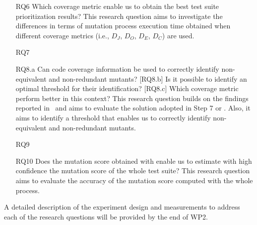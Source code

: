 \begin{itemize}
    \item[RQ6] Which coverage metric enable us to obtain the best test suite prioritization results? This research question aims to investigate the differences in terms of mutation process execution time obtained when different coverage metrics (i.e., $D_J$, $D_O$, $D_E$, $D_C$) are used.
    

    \item[RQ7] 

    \item[RQ8.a] Can code coverage information be used to correctly identify non-equivalent and non-redundant mutants? [RQ8.b] Is it possible to identify an optimal threshold for their identification? [RQ8.c] Which coverage metric perform better in this context? This research question builds on the findings reported in~\cite{schuler2013covering} and aims to evaluate the solution adopted in Step 7 or \APPR. Also, it aims to identify a threshold that enables us to correctly identify non-equivalent and non-redundant mutants.
    
    \item[RQ9] 

    \item[RQ10] Does the mutation score obtained with \APPR enable us to estimate with high confidence the mutation score of the whole test suite? This research question aims to evaluate the accuracy of the mutation score computed with the whole \APPR process.

    
    
    
\end{itemize}

A detailed description of the experiment design and measurements to address each of the research questions will be provided by the end of WP2.
